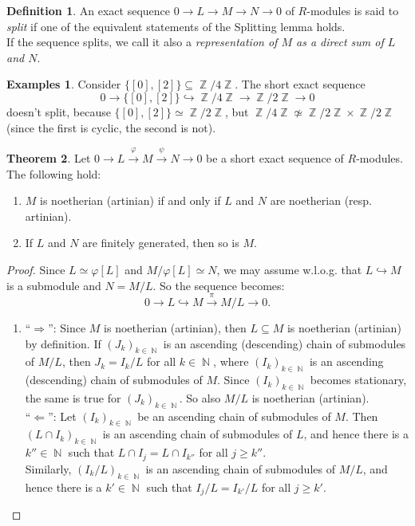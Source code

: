 \documentclass[12pt,a4paper]{report}
\theoremstyle{definition}
\newtheorem{theorem}{Theorem}[chapter] %
\newtheorem{defn}[theorem]{Definition}
\newtheorem*{examples}{Examples}
\theoremstyle{num.custom-title}
\DeclareMathOperator{\N}{\mathbb{N}}
\DeclareMathOperator{\Z}{\mathbb{Z}}
\DeclareMathOperator{\imp}{\Rightarrow}
\DeclareMathOperator{\pmi}{\Leftarrow}
\DeclareMathOperator{\sse}{\subseteq}
\renewcommand{\phi}{\varphi}
\begin{document}
\begin{defn}
An exact sequence $0 \to L \to M \to N \to 0$ of $R$-modules is said to \emph{split} if one of the equivalent statements of the Splitting lemma holds.\\
If the sequence splits, we call it also a \emph{representation of $M$ as a direct sum of $L$ and $N$}.
\end{defn}

\begin{examples}
Consider $\{[0],[2]\} \sse \Z/4\Z$. The short exact sequence
\[
0 \to \{[0],[2]\} \hookrightarrow \Z/4\Z \to \Z/2\Z \to 0
\]
doesn't split, because $\{[0],[2]\} \simeq \Z/2\Z$, but $\Z/4\Z \not\simeq \Z/2\Z \times \Z/2\Z$ (since the first is cyclic, the second is not).
\end{examples}

\begin{theorem}\label{ex-seq-mod}
Let $0 \to L \stackrel{\phi}{\to} M \stackrel{\psi}{\to} N \to 0$ be a short exact sequence of $R$-modules. The following hold:
\begin{enumerate}
\item $M$ is noetherian (artinian) if and only if $L$ and $N$ are noetherian (resp. artinian).
\item If $L$ and $N$ are finitely generated, then so is $M$.
\end{enumerate}
\begin{proof}
Since $L \simeq \phi[L]$ and $M/\phi[L] \simeq N$, we may assume w.l.o.g. that $L \hookrightarrow M$ is a submodule and $N=M/L$. So the sequence becomes:
\[
0 \to L \hookrightarrow M \stackrel{\pi}{\to} M/L \to 0.
\]
\begin{enumerate}
\item ``$\imp$'': Since $M$ is noetherian (artinian), then $L \sse M$ is noetherian (artinian) by definition. If $(J_k)_{k \in \N}$ is an ascending (descending) chain of submodules of $M/L$, then $J_k = I_k/L$ for all $k \in \N$, where $(I_k)_{k \in \N}$ is an ascending (descending) chain of submodules of $M$. Since $(I_k)_{k \in \N}$ becomes stationary, the same is true for $(J_k)_{k \in \N}$. So also $M/L$ is noetherian (artinian).
\\[6pt]
``$\pmi$'': Let $(I_k)_{k \in \N}$ be an ascending chain of submodules of $M$. Then $(L \cap I_k)_{k \in \N}$ is an ascending chain of submodules of $L$, and hence there is a $k'' \in \N$ such that $L \cap I_j = L \cap I_{k''}$ for all $j \geq k''$.\\
Similarly, $(I_k/L)_{k \in \N}$ is an ascending chain of submodules of $M/L$, and hence there is a $k' \in \N$ such that $I_j/L = I_{k'}/L$ for all $j \geq k'$.

\end{enumerate}
\end{proof}
\end{theorem}
\end{document}
